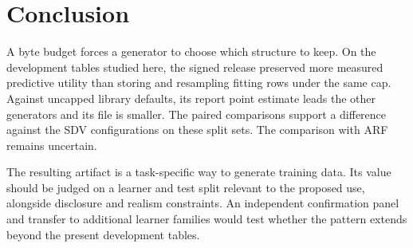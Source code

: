 \section{Conclusion}\label{sec:conclusion}

A byte budget forces a generator to choose which structure to keep. On the development tables studied here, the signed release preserved more measured predictive utility than storing and resampling fitting rows under the same cap. Against uncapped library defaults, its report point estimate leads the other generators and its file is smaller. The paired comparisons support a difference against the SDV configurations on these split sets. The comparison with ARF remains uncertain.

The resulting artifact is a task-specific way to generate training data. Its value should be judged on a learner and test split relevant to the proposed use, alongside disclosure and realism constraints. An independent confirmation panel and transfer to additional learner families would test whether the pattern extends beyond the present development tables.
